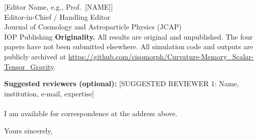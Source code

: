 \documentclass[12pt,a4paper]{letter}
\begin{document}
\begin{letter}{[Editor Name, e.g., Prof.\ [NAME]]\\
               Editor-in-Chief / Handling Editor\\
               Journal of Cosmology and Astroparticle Physics (JCAP)\\
               IOP Publishing}
\textbf{Originality.}
All results are original and unpublished. The four papers have not been submitted
elsewhere. All simulation code and outputs are publicly archived at
\url{https://github.com/cisomorph/Curvature-Memory_Scalar-Tensor_Gravity}.

\textbf{Suggested reviewers (optional):}
[SUGGESTED REVIEWER 1: Name, institution, e-mail, expertise]\\
[SUGGESTED REVIEWER 2: Name, institution, e-mail, expertise]\\
[SUGGESTED REVIEWER 3: Name, institution, e-mail, expertise]

I am available for correspondence at the address above.

\closing{Yours sincerely,}

\end{letter}
\end{document}
